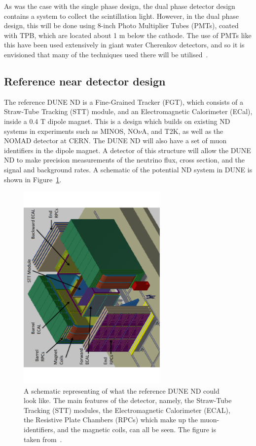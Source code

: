 As was the case with the single phase design, the dual phase detector design contains a system to collect the scintillation light. However, in the dual phase design, this will be done using 8-inch Photo Multiplier Tubes (PMTs), coated with TPB, which are located about 1 m below the cathode. The use of PMTs like this have been used extensively in giant water Cherenkov detectors, and so it is envisioned that many of the techniques used there will be utilised~\citep{1748-0221-6-01-C01081, Genolini:2008uc}. \\ 

\subsection{Reference near detector design} \label{sec:DUNEDetector_Near}
The reference DUNE ND is a Fine-Grained Tracker (FGT), which consists of a Straw-Tube Tracking (STT) module, and an Electromagnetic Calorimeter (ECal), inside a 0.4 T dipole magnet. This is a design which builds on existing ND systems in experiments such as MINOS, NO$\nu$A, and T2K, as well as the NOMAD detector at CERN. The DUNE ND will also have a set of muon identifiers in the dipole magnet. A detector of this structure will allow the DUNE ND to make precision measurements of the neutrino flux, cross section, and the signal and background rates. A schematic of the potential ND system in DUNE is shown in Figure~\ref{fig:DUNE_Near_Schem}. \\

\begin{figure}
  \centering
  \includegraphics[width=0.65\textwidth]{STT_Schematic}
  \caption[A schematic representation of what the reference DUNE ND could look like]
          {A schematic representing of what the reference DUNE ND could look like. The main features of the detector, namely, the Straw-Tube Tracking (STT) modules, the Electromagnetic Calorimeter (ECAL), the Resistive Plate Chambers (RPCs) which make up the muon-identifiers, and the magnetic coils, can all be seen. The figure is taken from~\citep{DUNECDR_V4}.}
  \label{fig:DUNE_Near_Schem}
\end{figure}

